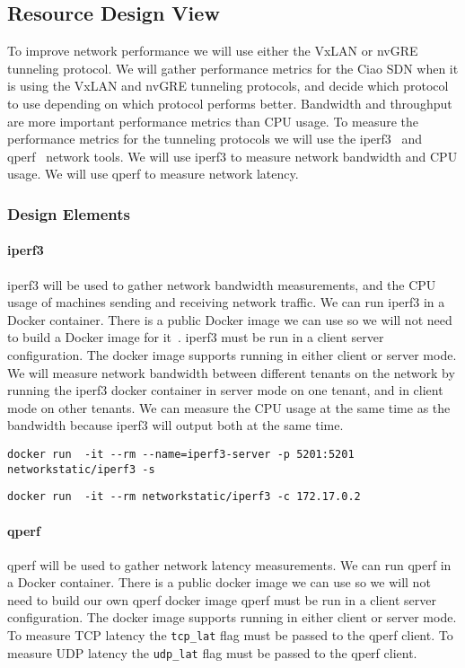 \documentclass[10pt,onecolumn,journal,draftclsnofoot]{IEEEtran}
\begin{document}
\subsection{Resource Design View}
To improve network performance we will use either the VxLAN or nvGRE tunneling 
protocol.
We will gather performance metrics for the Ciao SDN when it is using the VxLAN 
and nvGRE tunneling protocols, and decide which protocol to use depending on 
which protocol performs better. Bandwidth and throughput are more important 
performance metrics than CPU usage.
To measure the performance metrics for the tunneling protocols we will use 
the iperf3~\cite{iperf} and qperf~\cite{qperf} network tools.
We will use iperf3 to measure network bandwidth and 
CPU usage. We will use qperf to measure network latency.

\subsubsection{Design Elements}
\paragraph{iperf3}
iperf3 will be used to gather network bandwidth measurements, and the CPU usage 
of machines sending and receiving network traffic.
We can run iperf3 in a Docker container. 
There is a public Docker image we can use 
so we will not need to build a Docker image for it~\cite{iperfdocker}.
iperf3 must be run in a client server configuration.
The docker image supports running in either client or server mode.
We will measure network bandwidth between different tenants on the network 
by running the iperf3 docker container in server mode on one tenant, and in 
client mode on other tenants.
We can measure the CPU usage at the same time as the bandwidth because iperf3
will output both at the same time.

\begin{lstlisting}[caption = Running an iperf3 docker container in server mode]
docker run  -it --rm --name=iperf3-server -p 5201:5201 networkstatic/iperf3 -s
\end{lstlisting}

\begin{lstlisting}[caption = Running an iperf3 docker container in client mode]
docker run  -it --rm networkstatic/iperf3 -c 172.17.0.2
\end{lstlisting}

\paragraph{qperf}
qperf will be used to gather network latency measurements.
We can run qperf in a Docker container. There is a public docker image we can 
use so we will not need to build our own qperf docker image 
qperf must be run in a client server configuration. The docker image supports 
running in either client or server mode.
To measure TCP latency the \texttt{tcp\_lat} flag must be passed to the qperf 
client.
To measure UDP latency the \texttt{udp\_lat} flag must be passed to the qperf 
client.
\end{document}
